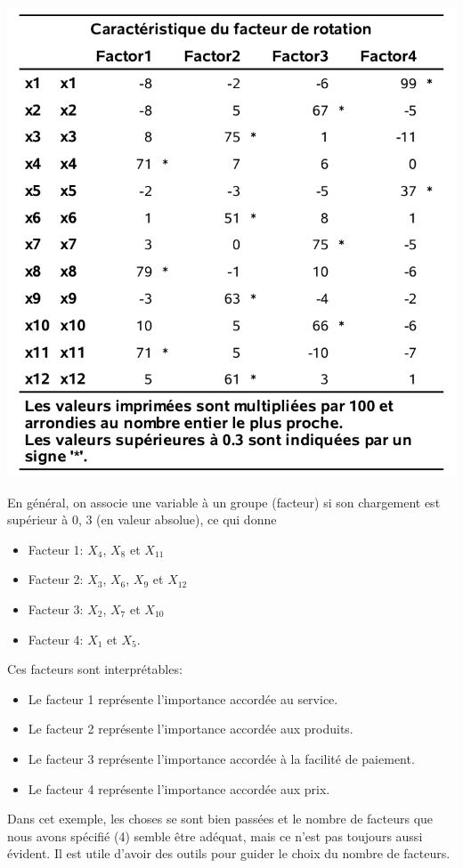 \documentclass[
]{book}
\providecommand{\tightlist}{%
  \setlength{\itemsep}{0pt}\setlength{\parskip}{0pt}}
\theoremstyle{definition}
\theoremstyle{definition}
\theoremstyle{definition}
\theoremstyle{remark}
\begin{document}
\begin{center}\includegraphics[width=0.7\linewidth]{figures/01-facto-e3} \end{center}

En général, on associe une variable à un groupe (facteur) si son chargement est supérieur à 0, 3 (en valeur absolue), ce qui donne

\begin{itemize}
\tightlist
\item
  Facteur 1: \(X_4\), \(X_8\) et \(X_{11}\)
\item
  Facteur 2: \(X_3\), \(X_6\), \(X_9\) et \(X_{12}\)
\item
  Facteur 3: \(X_2\), \(X_7\) et \(X_{10}\)
\item
  Facteur 4: \(X_1\) et \(X_5\).
\end{itemize}

Ces facteurs sont interprétables:

\begin{itemize}
\tightlist
\item
  Le facteur 1 représente l'importance accordée au service.
\item
  Le facteur 2 représente l'importance accordée aux produits.
\item
  Le facteur 3 représente l'importance accordée à la facilité de paiement.
\item
  Le facteur 4 représente l'importance accordée aux prix.
\end{itemize}

Dans cet exemple, les choses se sont bien passées et le nombre de facteurs que nous avons spécifié (4) semble être adéquat, mais ce n'est pas toujours aussi évident. Il est utile d'avoir des outils pour guider le choix du nombre de facteurs.
\end{document}
